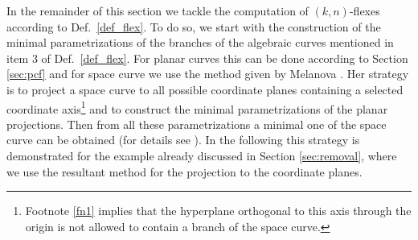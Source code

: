 \documentclass{svproc}
\begin{document}
In the remainder of this section we tackle the computation of $(k,n)$-flexes according to Def.\ \ref{def_flex}. 
To do so, we start with the construction of the minimal parametrizations of the branches of the algebraic curves mentioned in item 3 of Def.\ \ref{def_flex}. 
For planar curves this can be done according to Section \ref{sec:pcf} and for 
space curve we use the method given by Melanova \cite[page 112]{melanova}. Her  strategy is to  project a space curve to all possible coordinate planes containing a selected coordinate axis\footnote{Footnote \ref{fn1} implies that the hyperplane orthogonal to this axis through the origin is not allowed to contain a branch of the space curve.}
and to construct the minimal parametrizations of the planar projections. Then  from all these parametrizations a minimal one of the space curve can be obtained (for details see \cite{melanova}). 
In the following this strategy is demonstrated for the example already discussed in Section \ref{sec:removal}, where we use the resultant method for the projection to the coordinate planes.
\end{document}
